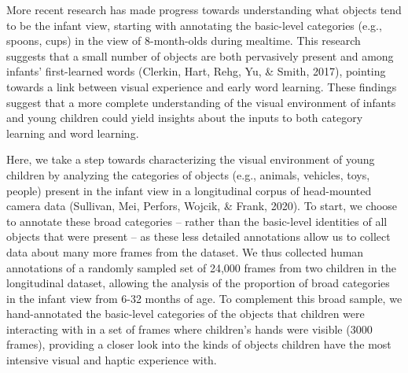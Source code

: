 \documentclass[10pt, letterpaper]{article}
\begin{document}
More recent research has made progress towards understanding what
objects tend to be the infant view, starting with annotating the
basic-level categories (e.g., spoons, cups) in the view of 8-month-olds
during mealtime. This research suggests that a small number of objects
are both pervasively present and among infants' first-learned words
(Clerkin, Hart, Rehg, Yu, \& Smith, 2017), pointing towards a link
between visual experience and early word learning. These findings
suggest that a more complete understanding of the visual environment of
infants and young children could yield insights about the inputs to both
category learning and word learning.

Here, we take a step towards characterizing the visual environment of
young children by analyzing the categories of objects (e.g., animals,
vehicles, toys, people) present in the infant view in a longitudinal
corpus of head-mounted camera data (Sullivan, Mei, Perfors, Wojcik, \&
Frank, 2020). To start, we choose to annotate these broad categories --
rather than the basic-level identities of all objects that were present
-- as these less detailed annotations allow us to collect data about
many more frames from the dataset. We thus collected human annotations
of a randomly sampled set of 24,000 frames from two children in the
longitudinal dataset, allowing the analysis of the proportion of broad
categories in the infant view from 6-32 months of age. To complement
this broad sample, we hand-annotated the basic-level categories of the
objects that children were interacting with in a set of frames where
children's hands were visible (3000 frames), providing a closer look
into the kinds of objects children have the most intensive visual and
haptic experience with.
\end{document}

